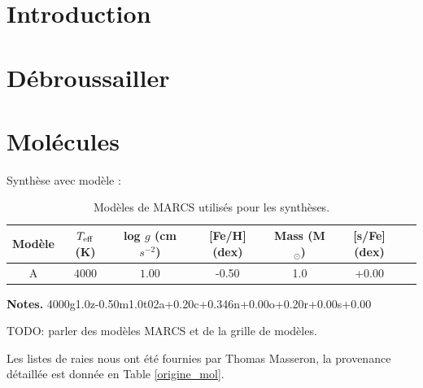 \documentclass{article}
\begin{document}
	

\vspace{0.9cm}

\tableofcontents

\clearpage

\section{\sc Introduction}

\section{\sc Débroussailler}


\section{\sc Molécules}

Synthèse avec modèle : 

\begin{table}[h!]
  \begin{center}
  \begin{tabular}{ccccccc}
      \hline
      \hline
      Modèle & $T_{\rm eff}$ (K) & log $g$ (cm $s^{-2}$) & [Fe/H] (dex) & Mass (M$_\odot$) & [s/Fe] (dex)\\
      \hline
      A &  $4000$ & $1.00$ & -0.50 & 1.0& +0.00 \\
      \hline
  \end{tabular}
  \end{center}
  \textbf{Notes.} 4000g1.0z-0.50m1.0t02a+0.20c+0.346n+0.00o+0.20r+0.00s+0.00
  \caption{Modèles de MARCS utilisés pour les synthèses.}
  \label{MARCS}
  \end{table} 
TODO: parler des modèles MARCS et de la grille de modèles.

Les listes de raies nous ont été fournies par Thomas Masseron, la provenance détaillée est donnée en Table \ref{origine_mol}. \par
\end{document}
